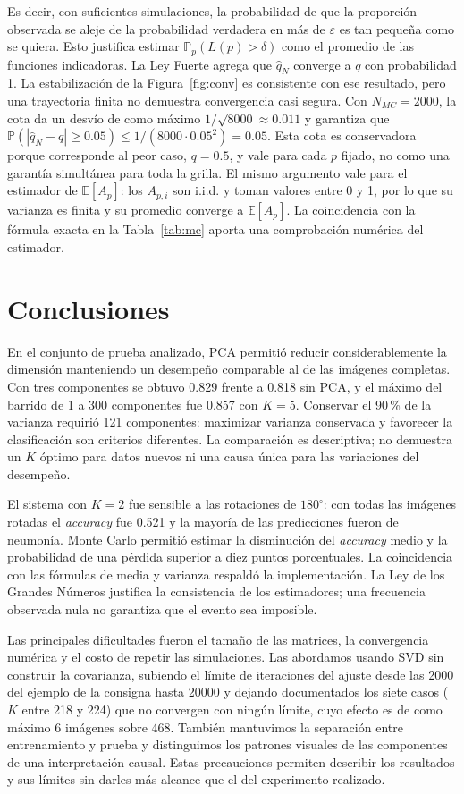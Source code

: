 \documentclass[11pt,a4paper]{article}
\newcommand{\E}{\mathbb{E}}
\newcommand{\Prob}{\mathbb{P}}
\newcommand{\acc}{\emph{accuracy}}
\begin{document}
Es decir, con suficientes simulaciones, la probabilidad de que la proporción observada se aleje de la
probabilidad verdadera en más de $\varepsilon$ es tan pequeña como se quiera. Esto justifica estimar
$\Prob_p(L(p)>\delta)$ como el promedio de las funciones indicadoras. La Ley Fuerte agrega que $\hat q_N$
converge a $q$ con probabilidad 1. La estabilización de la Figura~\ref{fig:conv} es consistente con
ese resultado, pero una trayectoria finita no demuestra convergencia casi segura. Con $N_{MC}=2000$, la
cota da un desvío de como máximo $1/\sqrt{8000}\approx0.011$ y garantiza que
$\Prob(|\hat q_N-q|\ge0.05)\le 1/(8000\cdot 0.05^2) = 0.05$. Esta cota es conservadora porque corresponde al
peor caso, $q=0.5$, y vale para cada $p$ fijado, no como una garantía simultánea para toda la grilla.
El mismo argumento vale para el estimador de $\E[A_p]$: los $A_{p,i}$ son i.i.d. y toman
valores entre 0 y 1, por lo que su varianza es finita y su promedio converge a $\E[A_p]$. La coincidencia con
la fórmula exacta en la Tabla~\ref{tab:mc} aporta una comprobación numérica del estimador.

\section{Conclusiones}
\label{sec:concl}
En el conjunto de prueba analizado, PCA permitió reducir considerablemente la dimensión manteniendo un
desempeño comparable al de las imágenes completas. Con tres componentes se obtuvo 0.829 frente a 0.818
sin PCA, y el máximo del barrido de 1 a 300 componentes fue 0.857 con $K=5$. Conservar el 90\,\%
de la varianza requirió 121 componentes: maximizar varianza conservada y favorecer la clasificación son
criterios diferentes. La comparación es descriptiva; no demuestra un $K$ óptimo para datos nuevos ni una
causa única para las variaciones del desempeño.

El sistema con $K=2$ fue sensible a las rotaciones de $180^\circ$: con todas las imágenes rotadas el
\acc{} fue 0.521 y la mayoría de las predicciones fueron de neumonía. Monte Carlo permitió estimar la disminución del
\acc{} medio y la probabilidad de una pérdida superior a diez puntos porcentuales. La coincidencia con
las fórmulas de media y varianza respaldó la implementación. La Ley de los
Grandes Números justifica la consistencia de los estimadores; una frecuencia observada nula no garantiza
que el evento sea imposible.

Las principales dificultades fueron el tamaño de las matrices, la convergencia numérica y el costo de
repetir las simulaciones. Las abordamos usando SVD sin construir la covarianza, subiendo el límite de
iteraciones del ajuste desde las 2000 del ejemplo de la consigna hasta 20000 y dejando documentados los
siete casos ($K$ entre 218 y 224) que no convergen con ningún límite, cuyo efecto es de como máximo 6
imágenes sobre 468. También mantuvimos
la separación entre entrenamiento y prueba y distinguimos los patrones visuales de las componentes de
una interpretación causal. Estas precauciones permiten describir los resultados y sus límites sin
darles más alcance que el del experimento realizado.
\end{document}
